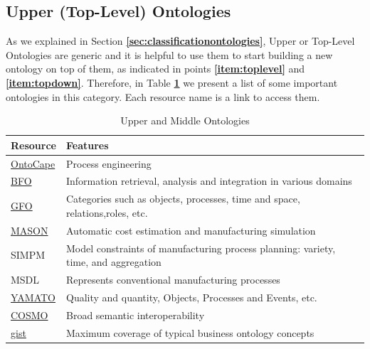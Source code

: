 \documentclass{guideline/sty/rapport}
\begin{document}
\subsection{Upper (Top-Level) Ontologies}
\label{sec:upperontologies}

As we explained in Section \textbf{\ref{sec:classificationontologies}}, Upper or Top-Level Ontologies are generic and it is helpful to use them to start building a new ontology on top of them, as indicated in points \textbf{\ref{item:toplevel}} and \textbf{\ref{item:topdown}}. Therefore, in Table \textbf{\ref{tab:upperontologies}} we present a list of some important ontologies in this category. Each resource name is a link to access them.

\begin{table}[H]
	\centering
	\begin{tabular}{ll}
		\hline
		\rowcolor{oceanboatblue!20} 
		\textbf{Resource} & \textbf{Features}\\
		\hline
\href{https://www.avt.rwth-aachen.de/cms/AVT/Forschung/Sonstiges/Software/~ipts/OntoCape/?lidx=1}{OntoCape} & Process engineering  \\

\href{https://github.com/bfo-ontology/BFO/wiki}{BFO} & Information retrieval, analysis and integration in various domains \\

\href{https://www.onto-med.de/ontologies/gfo}{GFO} & Categories such as objects, processes, time and space, relations,roles, etc.  \\

\href{https://sourceforge.net/projects/mason-onto/}{MASON} & Automatic cost estimation and manufacturing simulation \\

SIMPM & Model constraints of manufacturing process planning: variety, time, and aggregation\\

MSDL & Represents conventional manufacturing processes \\

\href{http://www.hozo.jp/onto_library/upperOnto.htm}{YAMATO} & Quality and quantity, Objects, Processes and Events, etc. \\

\href{http://ontolog.cim3.net/wiki/COSMO.html}{COSMO} & Broad semantic interoperability \\

\href{https://www.semanticarts.com/gist/}{gist} & Maximum coverage of typical business ontology concepts \\

\hline
\end{tabular}
\caption{Upper and Middle Ontologies} \label{tab:upperontologies}
\end{table}
\end{document}
